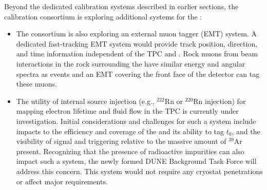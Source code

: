 Beyond the dedicated calibration systems described in earlier sections, the calibration consortium is exploring additional systems for the :
\begin{itemize}
\item The consortium is also exploring an external muon tagger (EMT) system. A dedicated fast-tracking EMT system would provide track position, direction, and time information independent of the TPC and . Rock muons from beam interactions in the rock surrounding the  have similar energy  and angular  spectra as  \numu events and an EMT covering the front face of the detector can tag these muons. 

\item The utility of internal source injection (e.g., ${}^{222}$Rn or ${}^{220}$Rn injection) for mapping electron lifetime and fluid flow in the TPC is currently under investigation.  Initial considerations and challenges for such a system include impacts to the efficiency and coverage of the  and its ability to tag $t_{0}$, and the visibility of signal and triggering relative to the massive amount of ${}^{39}$Ar present. Recognizing that the presence of radioactive impurities can also impact such a system, the newly formed DUNE  Background Task Force will address this concern. This system would not require any cryostat penetrations or affect major  requirements.
\end{itemize}


